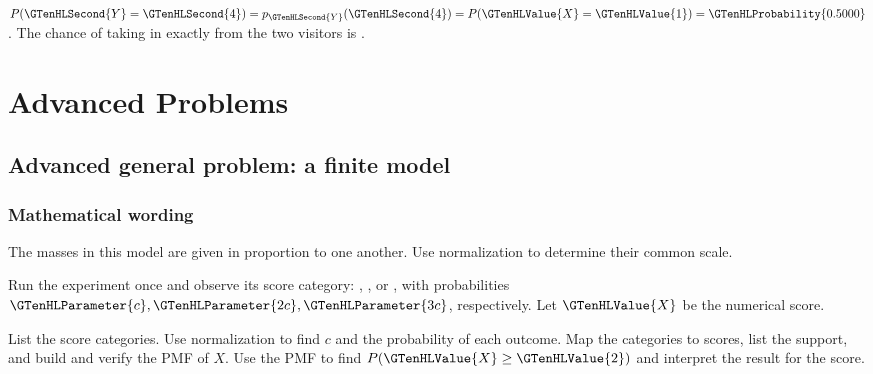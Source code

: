 $P(\GTenHLSecond{Y}=\GTenHLSecond{4})=p_{\GTenHLSecond{Y}}(\GTenHLSecond{4})=P(\GTenHLValue{X}=\GTenHLValue{1})=\GTenHLProbability{0.5000}$. The chance of taking in exactly  from the two visitors is .


\section{Advanced Problems}\label{sec:t2-c1-advanced}


\subsection{Advanced general problem: a finite model}
\label{subsec:t2-c1-advanced-general-problem-a-finite-model}
\subsubsection*{Mathematical wording}
The masses in this model are given in proportion to one another. Use normalization to determine their common scale.

Run the experiment once and observe its score category: , , or , with probabilities $\GTenHLParameter{c},\GTenHLParameter{2c},\GTenHLParameter{3c}$, respectively. Let $\GTenHLValue{X}$ be the numerical score.

    {List the score categories. Use normalization to find $c$ and the probability of each outcome.}
    {Map the categories to scores, list the support, and build and verify the PMF of $X$.}
    {Use the PMF to find $P(\GTenHLValue{X}\geq\GTenHLValue{2})$ and interpret the result for the score.}

